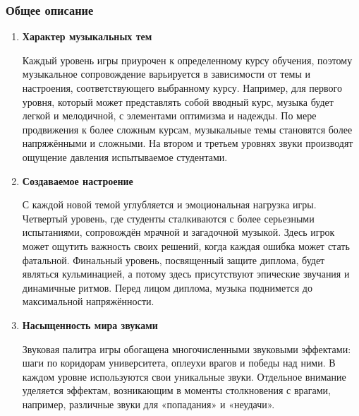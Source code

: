 \documentclass{article}
\begin{document}
\subsubsection{Общее описание}
    \begin{enumerate}
    \item \textbf{Характер музыкальных тем} \par
    Каждый уровень игры приурочен к определенному курсу обучения, поэтому музыкальное сопровождение варьируется в зависимости от темы и настроения, соответствующего выбранному курсу. Например, для первого уровня, который может представлять собой вводный курс, музыка будет легкой и мелодичной, с элементами оптимизма и надежды. По мере продвижения к более сложным курсам, музыкальные темы становятся более напряжёнными и сложными. На втором и третьем уровнях звуки производят ощущение давления испытываемое студентами.
    \item\textbf{Создаваемое настроение} \par
    С каждой новой темой углубляется и эмоциональная нагрузка игры. Четвертый уровень, где студенты сталкиваются с более серьезными испытаниями, сопровождён мрачной и загадочной музыкой. Здесь игрок может ощутить важность своих решений, когда каждая ошибка может стать фатальной. Финальный уровень, посвященный защите диплома, будет являться кульминацией, а потому здесь присутствуют эпические звучания и динамичные ритмов. Перед лицом диплома, музыка поднимется до максимальной напряжённости.
    \item \textbf{Насыщенность мира звуками} \par
    Звуковая палитра игры обогащена многочисленными звуковыми эффектами: шаги по коридорам университета, оплеухи врагов и победы над ними. В каждом уровне используются свои уникальные звуки. Отдельное внимание уделяется эффектам, возникающим в моменты столкновения с врагами, например, различные звуки для «попадания» и «неудачи».
    \end{enumerate}
\end{document}
